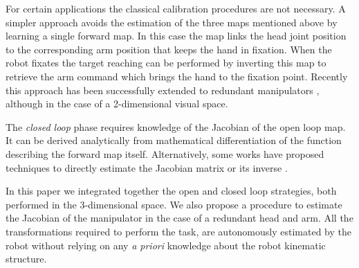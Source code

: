 For certain applications the classical calibration procedures are not 
necessary. A simpler approach \cite{blackburn94learning} avoids the estimation 
of the three maps mentioned above by learning a single forward map. 
In this case
the map links the head joint position to the corresponding arm position that
keeps the hand in fixation. When the robot fixates the target reaching can be 
performed by inverting this map to retrieve the arm command which brings
the hand to the fixation point. Recently this approach has been successfully 
extended to redundant manipulators \cite{lopes06learning}, although in the 
case of a 2-dimensional visual space.

The {\em closed loop} phase requires knowledge of the Jacobian of the open loop map.
It can be derived analytically from 
mathematical differentiation of the function describing the forward map itself. 
Alternatively, some works have proposed techniques to directly estimate the Jacobian matrix
\cite{Hosoda94versatile,Mansard06jacobian} or its inverse 
\cite{Lapreste04efficient}.

In this paper we integrated together the 
open \cite{blackburn94learning,Mansard06jacobian} and closed 
\cite{Hosoda94versatile,lopes06learning} loop 
strategies, both performed in the 3-dimensional space.
We also propose a procedure to estimate 
the Jacobian of the manipulator in the case of a redundant head and arm. All the 
transformations required to perform the task, are autonomously estimated by the robot 
 without relying on any \emph{a priori} knowledge about the robot 
kinematic structure.
